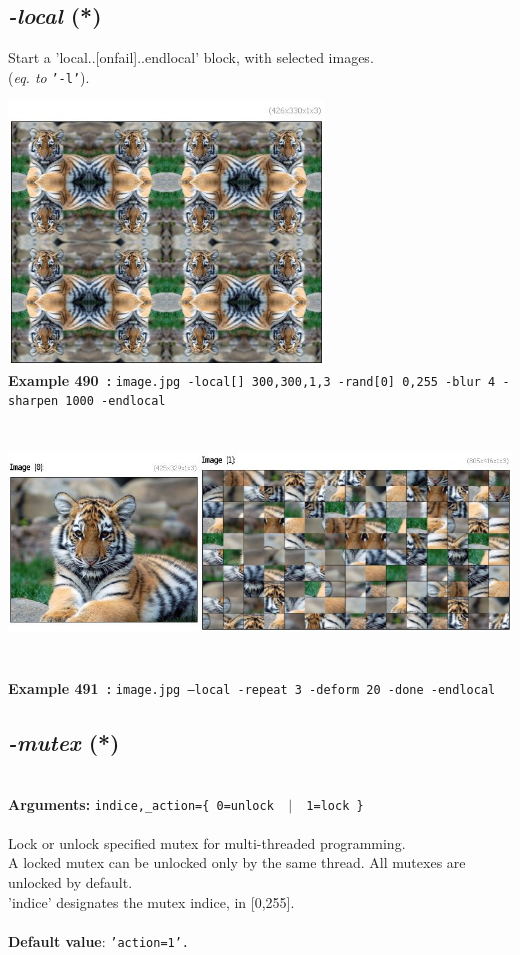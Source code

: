 \documentclass[a4paper,11pt,twoside]{book}
\begin{document}
\subsection{\emph{-local} (*)}\vspace*{-0.5em}
Start a 'local..[onfail]..endlocal' block, with selected images.
~\\(\emph{eq. to} {\small \texttt{'-l'}}).
\begin{center}\includegraphics[keepaspectratio=true,height=7cm,width=\textwidth]{img/gmic_def490.jpg}\\
{\footnotesize \textbf{Example 490~:} \texttt{image.jpg -local[] 300,300,1,3 -rand[0] 0,255 -blur 4 -sharpen 1000 -endlocal}}
\\\includegraphics[keepaspectratio=true,height=7cm,width=\textwidth]{img/gmic_def491.jpg}\\
{\footnotesize \textbf{Example 491~:} \texttt{image.jpg --local -repeat 3 -deform 20 -done -endlocal}}
\end{center}

\subsection{\emph{-mutex} (*)}\vspace*{-0.5em}
~\\\textbf{Arguments: } 
{\small \texttt{indice,\_action=\{ 0=unlock ~$|$~ 1=lock \}}}\\~\\
Lock or unlock specified mutex for multi-threaded programming.
~\\A locked mutex can be unlocked only by the same thread. All mutexes are unlocked by default.
~\\'indice' designates the mutex indice, in [0,255].
~\\~\\\textbf{Default value}: {\small \texttt{'action=1'.}}
\end{document}
